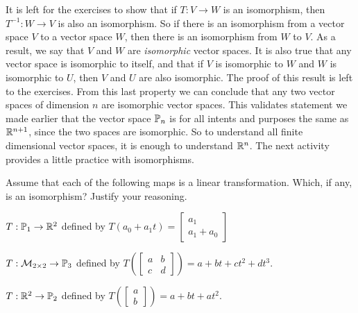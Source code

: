 It is left for the exercises to show that if $T: V \to W$ is an isomorphism, then $T^{-1}: W \to V$ is also an isomorphism. So if there is an isomorphism from a vector space $V$ to a vector space $W$, then there is an isomorphism from $W$ to $V$. As a result, we say that $V$ and $W$ are \emph{isomorphic} vector spaces. It is also true that any vector space is isomorphic to itself, and that if $V$ is isomorphic to $W$ and $W$ is isomorphic to $U$, then $V$ and $U$ are also isomorphic. The proof of this result is left to the exercises. From this last property we can conclude that any two vector spaces of dimension $n$ are isomorphic vector spaces. This validates statement we made earlier that the vector space $\mathbb{P}_n$ is for all intents and purposes the same as $\mathbb{R}^{n+1}$, since the two spaces are isomorphic. So to understand all finite dimensional vector spaces, it is enough to understand $\mathbb{R}^n$. The next activity provides a little practice with isomorphisms. 

\begin{activity} Assume that each of the following maps is a linear transformation. Which, if any, is an isomorphism? Justify your reasoning.
	\ba
	\item $T: \mathbb{P}_1 \to \mathbb{R}^2$ defined by $T(a_0+a_1t) = \left[ \begin{array}{c} a_1\\a_1+a_0 \end{array} \right]$
	\item $T: \mathcal{M}_{2 \times 2} \to \mathbb{P}_3$ defined by $T\left(\left[ \begin{array}{cc} a&b\\ c&d \end{array} \right] \right) = a+bt+ct^2+dt^3$. 
	\item $T: \mathbb{R}^2 \to \mathbb{P}_2$ defined by $T\left(\left[ \begin{array}{c} a\\ b \end{array} \right] \right) = a+bt+at^2$.
	\ea
	
\end{activity}




\ExampleIntro

